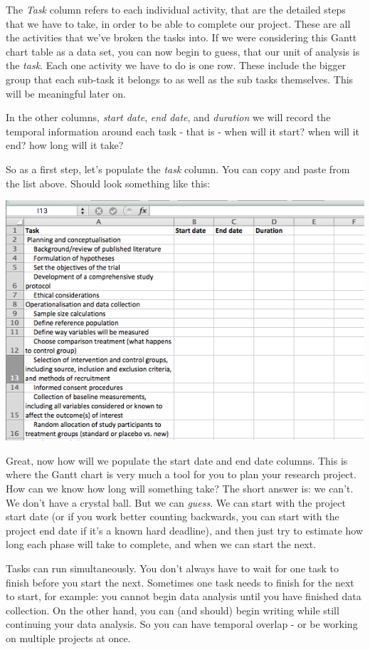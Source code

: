 \documentclass[]{book}
\theoremstyle{definition}
\theoremstyle{definition}
\theoremstyle{definition}
\theoremstyle{remark}
\begin{document}
The \emph{Task} column refers to each individual activity, that are the
detailed steps that we have to take, in order to be able to complete our
project. These are all the activities that we've broken the tasks into.
If we were considering this Gantt chart table as a data set, you can now
begin to guess, that our unit of analysis is the \emph{task}. Each one
activity we have to do is one row. These include the bigger group that
each sub-task it belongs to as well as the sub tasks themselves. This
will be meaningful later on.

In the other columns, \emph{start date}, \emph{end date}, and
\emph{duration} we will record the temporal information around each task
- that is - when will it start? when will it end? how long will it take?

So as a first step, let's populate the \emph{task} column. You can copy
and paste from the list above. Should look something like this:

\includegraphics{imgs/task_subtask_pop.png}

Great, now how will we populate the start date and end date columns.
This is where the Gantt chart is very much a tool for you to plan your
research project. How can we know how long will something take? The
short answer is: we can't. We don't have a crystal ball. But we can
\emph{guess}. We can start with the project start date (or if you work
better counting backwards, you can start with the project end date if
it's a known hard deadline), and then just try to estimate how long each
phase will take to complete, and when we can start the next.

Tasks can run simultaneously. You don't always have to wait for one task
to finish before you start the next. Sometimes one task needs to finish
for the next to start, for example: you cannot begin data analysis until
you have finished data collection. On the other hand, you can (and
should) begin writing while still continuing your data analysis. So you
can have temporal overlap - or be working on multiple projects at once.
\end{document}
